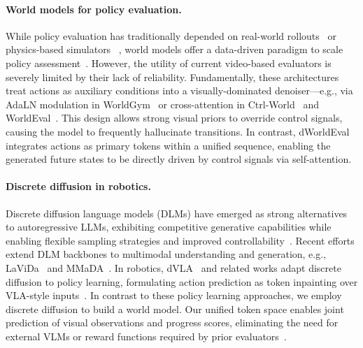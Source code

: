 \paragraph{World models for policy evaluation.} 
While policy evaluation has traditionally depended on real-world rollouts~\cite{li24simpler, zhou2025autoeval} or physics-based simulators
~\cite{mees2022calvin, mujoco, mu2021maniskill, gu2023maniskill2, xiang2020sapien, makoviychuk2021isaac, mittal2023orbit, yu2020metaworld, mu2025robotwin, sferrazza2024humanoidbench, grotz2024peract2, liu2023libero}, world models offer a data-driven paradigm to scale policy assessment~\cite{li2025worldeval,guo2025ctrl,quevedo2506worldgym,team2025evaluating,1xWorldModel,ho20251x,huang2025enerverse,jiang2025enerverse,tseng2025scalable}. However, the utility of current video-based evaluators is severely limited by their lack of reliability. Fundamentally, these architectures treat actions as auxiliary conditions into a visually-dominated denoiser—e.g., via AdaLN modulation in WorldGym~\cite{quevedo2506worldgym} or cross-attention in Ctrl-World~\cite{guo2025ctrl} and WorldEval~\cite{li2025worldeval}. This design allows strong visual priors to override control signals, causing the model to frequently hallucinate transitions.
In contrast, dWorldEval integrates actions as primary tokens within a unified sequence, enabling the generated future states to be directly driven by control signals via self-attention.

\paragraph{Discrete diffusion in robotics.}
Discrete diffusion language models (DLMs) have emerged as strong alternatives to autoregressive LLMs, exhibiting competitive generative capabilities while enabling flexible sampling strategies and improved controllability~\cite{austin2021structured,sahoo2024simple,lou2023discrete,LLaDA}. Recent efforts extend DLM backbones to multimodal understanding and generation, e.g., LaViDa~\cite{lavida} and MMaDA~\cite{MMaDA}. In robotics, dVLA~\cite{wen2025dvla} and related works adapt discrete diffusion to policy learning, formulating action prediction as token inpainting over VLA-style inputs~\cite{wen2025dvla,liang2025discrete,wen2025LLaDA}.
In contrast to these policy learning approaches, we employ discrete diffusion to build a world model. Our unified token space enables joint prediction of visual observations and progress scores, eliminating the need for external VLMs or reward functions required by prior evaluators~\cite{li2025worldeval,quevedo2506worldgym,guo2025ctrl}.

